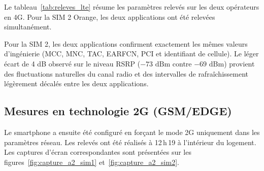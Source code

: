 \documentclass[11pt,a4paper]{article}
\begin{document}
Le tableau~\ref{tab:releves_lte} r\'esume les param\`etres relev\'es sur les deux op\'erateurs en 4G. Pour la SIM 2 Orange, les deux applications ont \'et\'e relev\'ees simultan\'ement.

\begin{table}[H]
\centering
\caption{Param\`etres relev\'es en mode 4G (LTE)}
\label{tab:releves_lte}
\end{table}

Pour la SIM 2, les deux applications confirment exactement les m\^emes valeurs d'ing\'enierie (MCC, MNC, TAC, EARFCN, PCI et identifiant de cellule). Le l\'eger \'ecart de 4 dB observ\'e sur le niveau RSRP ($-73\text{ dBm}$ contre $-69\text{ dBm}$) provient des fluctuations naturelles du canal radio et des intervalles de rafra\^ichissement l\'eg\`erement d\'ecal\'es entre les deux applications.

\subsection{Mesures en technologie 2G (GSM/EDGE)}

Le smartphone a ensuite \'et\'e configur\'e en for\c{c}ant le mode 2G uniquement dans les param\`etres r\'eseau. Les relev\'es ont \'et\'e r\'ealis\'es \`a 12\,h\,19 \`a l'int\'erieur du logement. Les captures d'\'ecran correspondantes sont pr\'esent\'ees sur les figures~\ref{fig:capture_a2_sim1} et~\ref{fig:capture_a2_sim2}.
\end{document}
